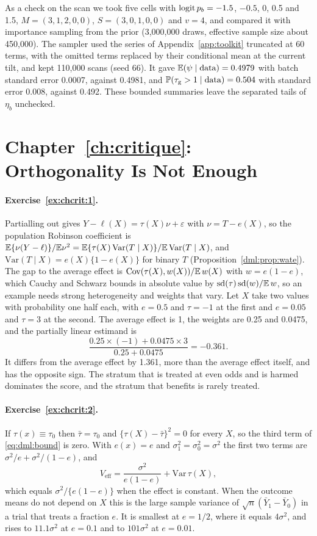 As a check on the scan we took five cells with $\operatorname{logit} p_b = -1.5$, $-0.5$, 0, 0.5 and 1.5, $M = (3, 1, 2, 0, 0)$, $S = (3, 0, 1, 0, 0)$ and $v = 4$, and compared it with importance sampling from the prior (3,000,000 draws, effective sample size about 450,000). The sampler used the series of Appendix~\ref{app:toolkit} truncated at 60 terms, with the omitted terms replaced by their conditional mean at the current tilt, and kept 110,000 scans (seed 66). It gave $\mathbb{E}(\psi \mid \text{data}) = 0.4979$ with batch standard error 0.0007, against 0.4981, and $\mathbb{P}(\tau_{\mathrm{g}} > 1 \mid \text{data}) = 0.504$ with standard error 0.008, against 0.492. These bounded summaries leave the separated tails of $\eta_b$ unchecked.

\section*{Chapter~\ref{ch:critique}: Orthogonality Is Not Enough}

\paragraph{Exercise~\ref{ex:chcrit:1}.} Partialling out gives $Y - \ell(X) = \tau(X)\nu + \varepsilon$ with $\nu = T - e(X)$, so the population Robinson coefficient is $\mathbb{E}\{\nu(Y - \ell)\}/\mathbb{E}\nu^2 = \mathbb{E}\{\tau(X)\,\mathrm{Var}(T \mid X)\}/\mathbb{E}\,\mathrm{Var}(T \mid X)$, and $\mathrm{Var}(T \mid X) = e(X)\{1 - e(X)\}$ for binary $T$ (Proposition~\ref{dml:prop:wate}). The gap to the average effect is $\mathrm{Cov}(\tau(X), w(X))/\mathbb{E}\,w(X)$ with $w = e(1 - e)$, which Cauchy and Schwarz bounds in absolute value by $\mathrm{sd}(\tau)\,\mathrm{sd}(w)/\mathbb{E}\,w$, so an example needs strong heterogeneity and weights that vary. Let $X$ take two values with probability one half each, with $e = 0.5$ and $\tau = -1$ at the first and $e = 0.05$ and $\tau = 3$ at the second. The average effect is 1, the weights are 0.25 and 0.0475, and the partially linear estimand is
\[
\frac{0.25 \times (-1) + 0.0475 \times 3}{0.25 + 0.0475} = -0.361.
\]
It differs from the average effect by 1.361, more than the average effect itself, and has the opposite sign. The stratum that is treated at even odds and is harmed dominates the score, and the stratum that benefits is rarely treated.

\paragraph{Exercise~\ref{ex:chcrit:2}.} If $\tau(x) \equiv \tau_0$ then $\bar\tau = \tau_0$ and $\{\tau(X) - \bar\tau\}^2 = 0$ for every $X$, so the third term of \eqref{eq:dml:bound} is zero. With $e(x) = e$ and $\sigma_1^2 = \sigma_0^2 = \sigma^2$ the first two terms are $\sigma^2/e + \sigma^2/(1 - e)$, and
\[
V_{\mathrm{eff}} = \frac{\sigma^2}{e(1 - e)} + \mathrm{Var}\,\tau(X),
\]
which equals $\sigma^2/\{e(1 - e)\}$ when the effect is constant. When the outcome means do not depend on $X$ this is the large sample variance of $\sqrt n(\bar Y_1 - \bar Y_0)$ in a trial that treats a fraction $e$. It is smallest at $e = 1/2$, where it equals $4\sigma^2$, and rises to $11.1\sigma^2$ at $e = 0.1$ and to $101\sigma^2$ at $e = 0.01$.

